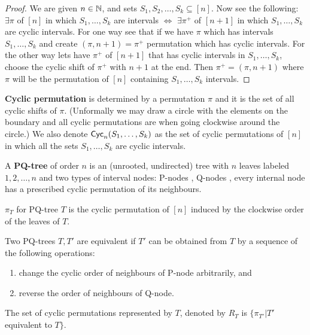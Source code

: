 \begin{proof}
	We are given $n \in \mathbb{N}$, and sets $S_1, S_2, \dots, S_k \subseteq [n]$. Now see the following: $\exists \pi$ of $[n]$ in which $S_1, \dots, S_k$ are intervals $\iff$ $\exists \pi^+$ of $[n+1]$ in which $S_1, \dots, S_k$ are cyclic intervals. For one way see that if we have $\pi$ which has intervals $S_1, \dots, S_k$ and create $(\pi, n+1) = \pi^+$ permutation which has cyclic intervals. For the other way lets have $\pi^+$ of $[n+1]$ that has cyclic intervals in $S_1, \dots, S_k$, choose the cyclic shift of $\pi^+$ with $n+1$ at the end. Then $\pi^+ = (\pi, n+1)$ where $\pi$ will be the permutation of $[n]$ containing $S_1, \dots, S_k$ intervals.
\end{proof}

\textbf{Cyclic permutation} is determined by a permutation $\pi$ and it is the set of all cyclic shifts of $\pi$. (Unformally we may draw a circle with the elements on the boundary and all cyclic permutations are when going clockwise around the circle.) We also denote $\textsf{Cyc}_{n}(S_1, \dots, S_k)$ as the set of cyclic permutations of $[n]$ in which all the sets $S_1, \dots, S_k$ are cyclic intervals.

\begin{defn}
	A \textbf{PQ-tree} of order $n$ is an (unrooted, undirected) tree with $n$ leaves labeled $1,2, \dots, n$ and two types of interval nodes: P-nodes \faCircle, Q-nodes \faCircle[regular], every internal node has a prescribed cyclic permutation of its neighbours.
\end{defn}

\begin{defn}
	$\pi_T$ for PQ-tree $T$ is the cyclic permutation of $[n]$ induced by the clockwise order of the leaves of $T$.
\end{defn}

\begin{defn}
	Two PQ-trees $T,T'$ are equivalent if $T'$ can be obtained from $T$ by a sequence of the following operations:
	
	\begin{enumerate}
		\item change the cyclic order of neighbours of P-node arbitrarily, and
		\item reverse the order of neighbours of Q-node.
	\end{enumerate}
\end{defn}

\begin{defn}
	The set of cyclic permutations represented by $T$, denoted by $R_T$ is $\{\pi_{T'} | T'$ equivalent to $T\}$.
\end{defn}

